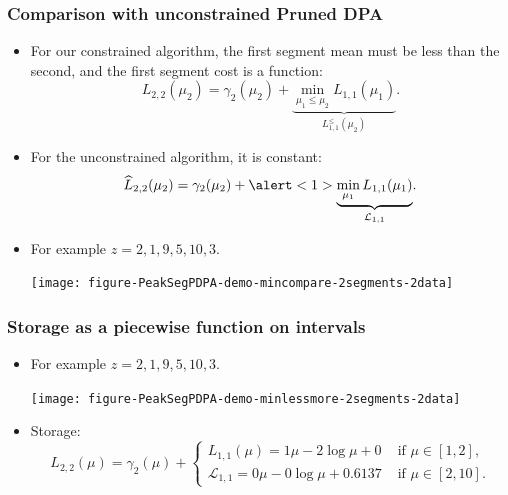 \documentclass{beamer}
\begin{document}
\begin{frame}
  \frametitle{Comparison with unconstrained Pruned DPA}
  \begin{itemize}
  \item For our constrained algorithm, the first segment mean must be
    less than the second, and the first segment cost is a function:
    \begin{equation*}
      L_{2,2}(\mu_2) = \gamma_2(\mu_2)+
      \underbrace{\min_{\mu_1 \leq \mu_2} L_{1,1}(\mu_1)}_{L^\leq_{1,1}(\mu_2)}.
    \end{equation*}
  \item For the unconstrained algorithm, it is \alert<1>{constant}:
    \begin{equation*}
      \widehat{L}_{2,2}(\mu_2) = \gamma_2(\mu_2)+
      \alert<1>{\underbrace{\min_{\mu_1} L_{1,1}(\mu_1)}_{\mathcal L_{1,1}}}.
    \end{equation*}
  \item For example $z = 2, 1, 9, 5, 10, 3$.
    \begin{center}
      \texttt{[image: figure-PeakSegPDPA-demo-mincompare-2segments-2data]}
    \end{center}
  \end{itemize}
\end{frame}

\begin{frame}
  \frametitle{Storage as a piecewise function on intervals}
  \begin{itemize}
  \item For example $z = 2, 1, 9, 5, 10, 3$.
    \begin{center}
      \texttt{[image: figure-PeakSegPDPA-demo-minlessmore-2segments-2data]}
    \end{center}
  \item Storage: 
    \begin{equation*}
      L_{2,2}(\mu) = \gamma_2(\mu) + 
      \begin{cases}
        L_{1,1}(\mu) = 1\mu - 2\log \mu + 0 & \text{ if } \mu\in[1,2],\\
        \mathcal L_{1,1} = 0\mu -0\log\mu + 0.6137 & \text{ if } \mu\in[2,10].
      \end{cases}
    \end{equation*}
  \end{itemize}
\end{frame}
\end{document}
